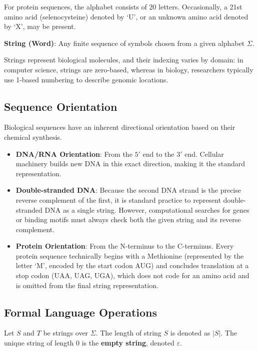 \documentclass[11pt,a4paper]{article}
\newcommand{\sta}{\textbf{\textcolor{red}{\sffamily\upshape [!]}} }
\begin{document}
For protein sequences, the alphabet consists of 20 letters. Occasionally, a 21st amino acid (selenocysteine) denoted by `U', or an unknown amino acid denoted by `X', may be present. 

\begin{important}
\textbf{String (Word)}: Any finite sequence of symbols chosen from a given alphabet \(\Sigma\). 
\end{important}

Strings represent biological molecules, and their indexing varies by domain: in computer science, strings are zero-based, whereas in biology, researchers typically use 1-based numbering to describe genomic locations. 

\subsection{Sequence Orientation}
Biological sequences have an inherent directional orientation based on their chemical synthesis.
\begin{itemize}
    \item \textbf{DNA/RNA Orientation}: From the \(5'\) end to the \(3'\) end. Cellular machinery builds new DNA in this exact direction, making it the standard representation.
    \item \textbf{Double-stranded DNA}: Because the second DNA strand is the precise reverse complement of the first, it is standard practice to represent double-stranded DNA as a single string. \sta However, computational searches for genes or binding motifs must always check both the given string and its reverse complement.
    \item \textbf{Protein Orientation}: From the N-terminus to the C-terminus. Every protein sequence technically begins with a Methionine (represented by the letter `M', encoded by the start codon AUG) and concludes translation at a stop codon (UAA, UAG, UGA), which does not code for an amino acid and is omitted from the final string representation.
\end{itemize}

\subsection{Formal Language Operations}

Let \(S\) and \(T\) be strings over \(\Sigma\). The length of string \(S\) is denoted as \(|S|\). The unique string of length 0 is the \textbf{empty string}, denoted \(\varepsilon\).
\end{document}
